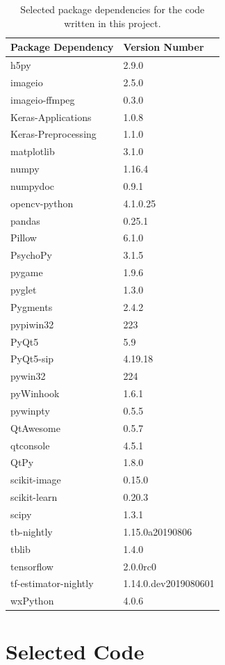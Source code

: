 \documentclass[a4paper,11pt,openany]{book}
\begin{document}
\begin{appendices}
\linespread{1.1}
\thispagestyle{empty}
\begin{table}[htbp]
\caption[Selected package dependencies for the project.]{\label{tab:org7ef73ca}
Selected package dependencies for the code written in this project.}
\centering
\small
\begin{tabu}{Xl}
\textbf{Package Dependency} & \textbf{Version Number}\\
\hline
h5py & 2.9.0\\
imageio & 2.5.0\\
imageio-ffmpeg & 0.3.0\\
Keras-Applications & 1.0.8\\
Keras-Preprocessing & 1.1.0\\
matplotlib & 3.1.0\\
numpy & 1.16.4\\
numpydoc & 0.9.1\\
opencv-python & 4.1.0.25\\
pandas & 0.25.1\\
Pillow & 6.1.0\\
PsychoPy & 3.1.5\\
pygame & 1.9.6\\
pyglet & 1.3.0\\
Pygments & 2.4.2\\
pypiwin32 & 223\\
PyQt5 & 5.9\\
PyQt5-sip & 4.19.18\\
pywin32 & 224\\
pyWinhook & 1.6.1\\
pywinpty & 0.5.5\\
QtAwesome & 0.5.7\\
qtconsole & 4.5.1\\
QtPy & 1.8.0\\
scikit-image & 0.15.0\\
scikit-learn & 0.20.3\\
scipy & 1.3.1\\
tb-nightly & 1.15.0a20190806\\
tblib & 1.4.0\\
tensorflow & 2.0.0rc0\\
tf-estimator-nightly & 1.14.0.dev2019080601\\
wxPython & 4.0.6\\
\end{tabu}
\end{table}

\chapter{Selected Code}
\label{sec:orgccef79a}
\label{org3f322c2}


\end{appendices}
\end{document}
